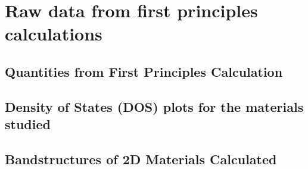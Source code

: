 \documentclass[manuscript=suppinfo,email=true,hyperref=true,keywords=false]{achemso}
\begin{document}
\section{Raw data from first principles calculations}
\subsection{Quantities from First Principles Calculation}
\label{sec:raw}



\subsection{Density of States (DOS) plots for the materials studied}
\label{sec:DOS}




\subsection{Bandstructures of 2D Materials Calculated}
\label{sec:bs}




\clearpage{}
\section*{}
\label{sec:ref}

\end{document}
